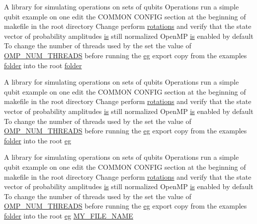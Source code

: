 \begin{DoxyCompactItemize}
\item 
A library for simulating operations on sets of qubits Operations run a simple qubit example on one edit the COMMON CONFIG section at the beginning of makefile in the root directory Change perform \hyperlink{README_8md_a168d0f076329da35a2b080049c35cecd}{rotations} and verify that the state vector of probability amplitudes \hyperlink{README_8md_ac361bc388656077907485b42e1531a85}{is} still normalized OpenMP \hyperlink{README_8md_ac361bc388656077907485b42e1531a85}{is} enabled by default To change the number of threads used by the set the value of \hyperlink{README_8md_ac0f875e6c5b5526a6781e0fbba81e6a4}{OMP\_\-NUM\_\-THREADS} before running the \hyperlink{README_8md_a60a90a09308ad7ec0ea2ac389281518b}{eg} export copy from the examples \hyperlink{README_8md_ac5527449269e33be598e819921cd9e43}{folder} into the root \hyperlink{README_8md_ac5527449269e33be598e819921cd9e43}{folder}
\item 
A library for simulating operations on sets of qubits Operations run a simple qubit example on one edit the COMMON CONFIG section at the beginning of makefile in the root directory Change perform \hyperlink{README_8md_a168d0f076329da35a2b080049c35cecd}{rotations} and verify that the state vector of probability amplitudes \hyperlink{README_8md_ac361bc388656077907485b42e1531a85}{is} still normalized OpenMP \hyperlink{README_8md_ac361bc388656077907485b42e1531a85}{is} enabled by default To change the number of threads used by the set the value of \hyperlink{README_8md_ac0f875e6c5b5526a6781e0fbba81e6a4}{OMP\_\-NUM\_\-THREADS} before running the \hyperlink{README_8md_a60a90a09308ad7ec0ea2ac389281518b}{eg} export copy from the examples \hyperlink{README_8md_ac5527449269e33be598e819921cd9e43}{folder} into the root \hyperlink{README_8md_a60a90a09308ad7ec0ea2ac389281518b}{eg}
\item 
A library for simulating operations on sets of qubits Operations run a simple qubit example on one edit the COMMON CONFIG section at the beginning of makefile in the root directory Change perform \hyperlink{README_8md_a168d0f076329da35a2b080049c35cecd}{rotations} and verify that the state vector of probability amplitudes \hyperlink{README_8md_ac361bc388656077907485b42e1531a85}{is} still normalized OpenMP \hyperlink{README_8md_ac361bc388656077907485b42e1531a85}{is} enabled by default To change the number of threads used by the set the value of \hyperlink{README_8md_ac0f875e6c5b5526a6781e0fbba81e6a4}{OMP\_\-NUM\_\-THREADS} before running the \hyperlink{README_8md_a60a90a09308ad7ec0ea2ac389281518b}{eg} export copy from the examples \hyperlink{README_8md_ac5527449269e33be598e819921cd9e43}{folder} into the root \hyperlink{README_8md_a60a90a09308ad7ec0ea2ac389281518b}{eg} \hyperlink{README_8md_a5e27239809b7b98bd9a7f543012390be}{MY\_\-FILE\_\-NAME}

\end{DoxyCompactItemize}
